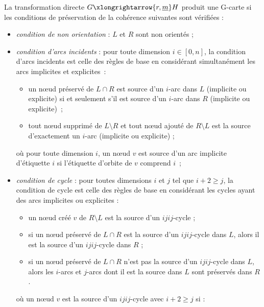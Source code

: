 \begin{theoreme}
	La transformation directe $G \xlongrightarrow{r, \underline{m}} H$ produit
	une G-carte si les conditions de préservation de la cohérence suivantes sont
	vérifiées :
	\begin{itemize}
		\item \emph{condition de non orientation} : $L$ et $R$ sont non orientés ;
		\item \emph{condition d'arcs incidents} : pour toute dimension
		      $i \in [0, n]$, la condition d'arcs incidents est celle des règles de
		      base en considérant simultanément les arcs implicites et
		      explicites~:
		      \begin{itemize}
			      \item un n\oe ud préservé de $L \cap R$ est source d'un $i$-arc dans
			            $L$ (implicite ou explicite) si et seulement s'il est
			            source d'un $i$-arc dans $R$ (implicite ou explicite)~;
			      \item tout n\oe ud supprimé de $L \setminus R$ et tout n\oe ud ajouté de
			            $R \setminus L$ est la source d'exactement un $i$-arc (implicite
			            ou explicite) ;
		      \end{itemize}
		      \vspace{3pt}
		      où pour toute dimension $i$, un n\oe ud $v$ est source d'un arc implicite d'étiquette $i$
		      si l'étiquette d'orbite de $v$ comprend $i$~;
		      \vspace{3pt}
		\item \emph{condition de cycle} : pour toutes dimensions $i$ et $j$ tel que
		      $i+2 \geq j$, la condition de cycle est celle des règles de base en considérant les
		      cycles ayant des arcs implicites ou explicites :
		      \begin{itemize}
			      \item un n\oe ud créé $v$ de $R \setminus L$ est la source d'un $ijij$-cycle ;
			      \item si un n\oe ud préservé de $L \cap R$ est la source d'un $ijij$-cycle dans
			            $L$, alors il est la source d'un $ijij$-cycle dans $R$ ;
			      \item si un n\oe ud préservé de $L \cap R$ n'est pas la source d'un $ijij$-cycle
			            dans $L$, alors les $i$-arcs et $j$-arcs dont il est la source dans $L$ sont
			            préservés dans $R$.
		      \end{itemize}
		      \vspace{3pt}
		      où un n\oe ud $v$ est la source d'un $ijij$-cycle avec $i+2 \geq j$ si :

\end{itemize}
\end{theoreme}
